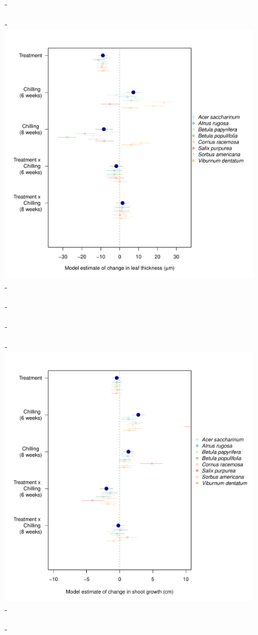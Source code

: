 \documentclass{article}\usepackage[]{graphicx}\usepackage[]{color}
\begin{document}
  {\begin{figure} [H]
  -\begin{center}
  -\includegraphics[width=16cm]{..//analyses/figures/thickness_brms.pdf} %
  -\end{center}
  -\end{figure}}
  
  {\begin{figure} [H]
  -\begin{center}
  -\includegraphics[width=16cm]{..//analyses/figures/htdiff_brms.pdf} %
  -\end{center}
  -\end{figure}}
  
\end{document}
